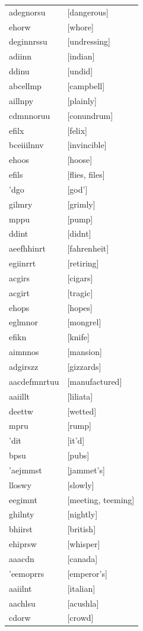 \documentclass{article}
\begin{document}
\begin{tabular}{ll}
adegnorsu & [dangerous] \\
ehorw & [whore] \\
deginnrssu & [undressing] \\
adiinn & [indian] \\
ddinu & [undid] \\
abcellmp & [campbell] \\
aillnpy & [plainly] \\
cdmnnoruu & [conundrum] \\
efilx & [felix] \\
bceiiilnnv & [invincible] \\
ehoos & [hoose] \\
efils & [flies, files] \\
'dgo & [god'] \\
gilmry & [grimly] \\
mppu & [pump] \\
ddint & [didnt] \\
aeefhhinrt & [fahrenheit] \\
egiinrrt & [retiring] \\
acgirs & [cigars] \\
acgirt & [tragic] \\
ehops & [hopes] \\
eglmnor & [mongrel] \\
efikn & [knife] \\
aimnnos & [mansion] \\
adgirszz & [gizzards] \\
aacdefmnrtuu & [manufactured] \\
aaiillt & [liliata] \\
deettw & [wetted] \\
mpru & [rump] \\
'dit & [it'd] \\
bpsu & [pubs] \\
'aejmmst & [jammet's] \\
lloswy & [slowly] \\
eegimnt & [meeting, teeming] \\
ghilnty & [nightly] \\
bhiirst & [british] \\
ehiprsw & [whisper] \\
aaacdn & [canada] \\
'eemoprrs & [emperor's] \\
aaiilnt & [italian] \\
aachlsu & [acushla] \\
cdorw & [crowd] \\

\end{tabular}
\end{document}

